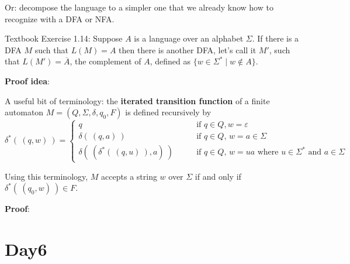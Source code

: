 \documentclass[12pt, oneside]{article}
\begin{document}
\vfill
\newpage
Or: decompose the language to a simpler one 
that we already know how to recognize with a DFA or NFA.


Textbook Exercise 1.14: 
Suppose $A$ is a language over an alphabet $\Sigma$. 
If there is a DFA $M$ such that $L(M) = A$ then there is another DFA, let's call it $M'$, such that 
$L(M') = \overline{A}$, the complement of $A$, defined as $\{ w \in \Sigma^* \mid w \notin A \}$.


{\bf Proof idea}:


\vfill
A useful bit of terminology: the {\bf iterated transition function} of a finite automaton
$M = (Q, \Sigma, \delta, q_0, F)$ is defined recursively by
\[
\delta^* (~(q,w)~) 
=\begin{cases}
q  \qquad &\text{if $q \in Q, w = \varepsilon$} \\
\delta( ~(q,a)~) \qquad &\text{if $q \in Q$, $w = a \in \Sigma$ } \\
\delta(~(\delta^*(~(q,u)~), a) ~) \qquad &\text{if $q \in Q$, $w = ua$ where $u \in  \Sigma^*$ and $a \in \Sigma$}
\end{cases}
\]

Using  this terminology, $M$ accepts a string $w$ over $\Sigma$ if and only if $\delta^*( ~(q_0,w)~) \in F$.


{\bf Proof}: 
\vfill

 \vfill
\section*{Day6}
\end{document}
